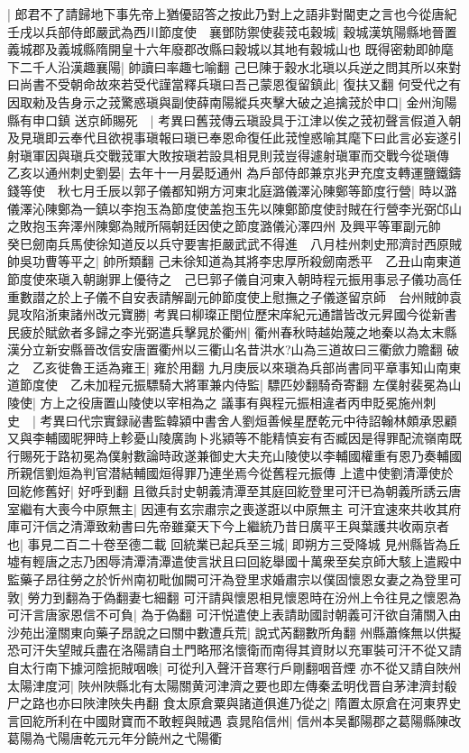 |{
	郎君不了請歸地下事先帝上猶優詔答之按此乃對上之語非對閽吏之言也今從唐紀}
壬戌以兵部侍郎嚴武為西川節度使　襄鄧防禦使裴茙屯穀城|{
	穀城漢筑陽縣地晉置義城郡及義城縣隋開皇十六年廢郡改縣曰穀城以其地有穀城山也}
既得密勅即帥麾下二千人沿漢趣襄陽|{
	帥讀曰率趣七喻翻}
己巳陳于穀水北瑱以兵逆之問其所以來對曰尚書不受朝命故來若受代謹當釋兵瑱曰吾己蒙恩復留鎮此|{
	復扶又翻}
何受代之有因取勑及告身示之茙驚惑瑱與副使薛南陽縱兵夾擊大破之追擒茙於申口|{
	金州洵陽縣有申口鎮}
送京師賜死　|{
	考異曰舊茙傳云瑱設具于江津以俟之茙初聲言假道入朝及見瑱即云奉代且欲視事瑱報曰瑱已奉恩命復任此茙惶惑喻其麾下曰此言必妄遂引射瑱軍因與瑱兵交戰茙軍大敗按瑱若設具相見則茙豈得遽射瑱軍而交戰今從瑱傳}
乙亥以通州刺史劉晏|{
	去年十一月晏貶通州}
為戶部侍郎兼京兆尹充度支轉運鹽鐵鑄錢等使　秋七月壬辰以郭子儀都知朔方河東北庭潞儀澤沁陳鄭等節度行營|{
	時以潞儀澤沁陳鄭為一鎮以李抱玉為節度使盖抱玉先以陳鄭節度使討賊在行營李光弼邙山之敗抱玉奔澤州陳鄭為賊所隔朝廷因使之節度潞儀沁澤四州}
及興平等軍副元帥　癸巳劒南兵馬使徐知道反以兵守要害拒嚴武武不得進　八月桂州刺史邢濟討西原賊帥吳功曹等平之|{
	帥所類翻}
己未徐知道為其將李忠厚所殺劒南悉平　乙丑山南東道節度使來瑱入朝謝罪上優待之　己巳郭子儀自河東入朝時程元振用事忌子儀功高任重數譛之於上子儀不自安表請解副元帥節度使上慰撫之子儀遂留京師　台州賊帥袁晁攻陷浙東諸州改元寶勝|{
	考異曰柳璨正閏位歷宋庠紀元通譜皆改元昇國今從新書}
民疲於賦歛者多歸之李光弼遣兵擊晁於衢州|{
	衢州春秋時越始蔑之地秦以為太末縣漢分立新安縣晉改信安唐置衢州以三衢山名昔洪水?山為三道故曰三衢歛力贍翻}
破之　乙亥徙魯王适為雍王|{
	雍於用翻}
九月庚辰以來瑱為兵部尚書同平章事知山南東道節度使　乙未加程元振驃騎大將軍兼内侍監|{
	驃匹妙翻騎奇寄翻}
左僕射裴冕為山陵使|{
	方上之役唐置山陵使以宰相為之}
議事有與程元振相違者丙申貶冕施州刺史　|{
	考異曰代宗實録祕書監韓潁中書舍人劉烜善候星歷乾元中待詔翰林頗承恩顧又與李輔國昵狎時上軫憂山陵廣詢卜兆潁等不能精慎妄有否臧因是得罪配流嶺南既行賜死于路初冕為僕射數論時政遂兼御史大夫充山陵使以李輔國權重有恩乃奏輔國所親信劉烜為判官潜結輔國烜得罪乃連坐焉今從舊程元振傳}
上遣中使劉清潭使於回紇修舊好|{
	好呼到翻}
且徵兵討史朝義清潭至其庭回紇登里可汗已為朝義所誘云唐室繼有大喪今中原無主|{
	因連有玄宗肅宗之喪遂誑以中原無主}
可汗宜速來共收其府庫可汗信之清潭致勑書曰先帝雖棄天下今上繼統乃昔日廣平王與葉護共收兩京者也|{
	事見二百二十卷至德二載}
回統業已起兵至三城|{
	即朔方三受降城}
見州縣皆為丘墟有輕唐之志乃困辱清潭清潭遣使言狀且曰回紇舉國十萬衆至矣京師大駭上遣殿中監藥子昂往勞之於忻州南初毗伽闕可汗為登里求婚肅宗以僕固懷恩女妻之為登里可敦|{
	勞力到翻為于偽翻妻七細翻}
可汗請與懷恩相見懷恩時在汾州上令往見之懷恩為可汗言唐家恩信不可負|{
	為于偽翻}
可汗悦遣使上表請助國討朝義可汗欲自蒲關入由沙苑出潼關東向藥子昂說之曰關中數遭兵荒|{
	說式芮翻數所角翻}
州縣蕭條無以供擬恐可汗失望賊兵盡在洛陽請自土門略邢洺懷衛而南得其資財以充軍裝可汗不從又請自太行南下據河陰扼賊咽㗋|{
	可從刋入聲汗音寒行戶剛翻咽音煙}
亦不從又請自陜州太陽津度河|{
	陜州陜縣北有太陽關黄河津濟之要也即左傳秦孟明伐晋自茅津濟封殽尸之路也亦曰陜津陜失冉翻}
食太原倉粟與諸道俱進乃從之|{
	隋置太原倉在河東界史言回紇所利在中國財寶而不敢輕與賊遇}
袁晁陷信州|{
	信州本吴鄱陽郡之葛陽縣陳改葛陽為弋陽唐乾元元年分饒州之弋陽衢}



